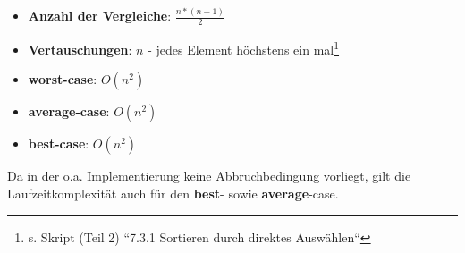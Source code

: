 \begin{itemize}
    \item \textbf{Anzahl der Vergleiche}: $\frac{n * ( n - 1)}{2}$
    \item \textbf{Vertauschungen}: $n$ - jedes Element höchstens ein mal\footnote{s. Skript (Teil 2) ``7.3.1 Sortieren durch direktes Auswählen``
    }
\end{itemize}

\begin{itemize}
    \item \textbf{worst-case}: $O(n^2)$
    \item \textbf{average-case}:  $O(n^2)$
    \item \textbf{best-case}:  $O(n^2)$
\end{itemize}

\noindent
Da in der o.a. Implementierung keine Abbruchbedingung vorliegt, gilt die Laufzeitkomplexität auch für den \textbf{best}- sowie \textbf{average}-case.

